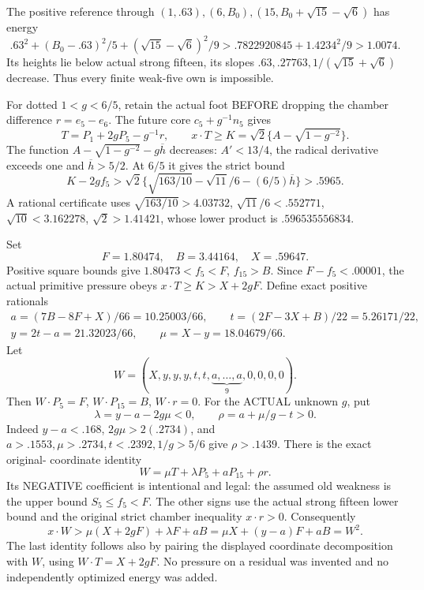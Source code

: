 \documentclass[11pt]{article}
\theoremstyle{definition}
\theoremstyle{remark}
\begin{document}
The positive reference through
\((1,.63),(6,B_0),(15,B_0+\sqrt{15}-\sqrt6)\)
has energy
\[
 .63^2+(B_0-.63)^2/5+(\sqrt{15}-\sqrt6)^2/9
                         >.7822920845+1.4234^2/9>1.0074 .
\]
Its heights lie below actual
strong fifteen, its slopes
\(.63,.27763,1/(\sqrt{15}+\sqrt6)\)
decrease.
Thus every finite weak-five own
is impossible.

For dotted \(1<g<6/5\), retain
the actual foot BEFORE dropping
the chamber difference
\(r=e_5-e_6\).
The future core
\(c_5+g^{-1}n_5\) gives
\[
 T=P_1+2gP_5-g^{-1}r,\qquad
        x\cdot T\ge K=\sqrt2\{A-\sqrt{1-g^{-2}}\}.
\]
The function
\(A-\sqrt{1-g^{-2}}-g\overline h\)
decreases: \(A'<13/4\), the
radical derivative exceeds one
and \(\overline h>5/2\).
At \(6/5\) it gives the strict
bound
\[
 K-2gf_5>
 \sqrt2\{\sqrt{163/10}-\sqrt{11}/6-(6/5)\overline h\}
                                      >.5965 .
\]
A rational certificate uses
\(\sqrt{163/10}>4.03732\),
\(\sqrt{11}/6<.552771\),
\(\sqrt{10}<3.162278\),
\(\sqrt2>1.41421\), whose lower
product is \(.596535556834\).

Set
\[
 F=1.80474,\quad B=3.44164,\quad X=.59647 .
\]
Positive square bounds give
\(1.80473<f_5<F\), \(f_{15}>B\).
Since \(F-f_5<.00001\), the
actual primitive pressure obeys
\(x\cdot T\ge K>X+2gF\).
Define exact positive rationals
\[
\begin{gathered}
 a=(7B-8F+X)/66=10.25003/66,\qquad
 t=(2F-3X+B)/22=5.26171/22,\\
 y=2t-a=21.32023/66,\qquad
 \mu=X-y=18.04679/66 .
\end{gathered}
\]
Let
\[
 W=(X,y,y,y,t,t,
            \underbrace{a,\ldots,a}_{9},0,0,0,0).
\]
Then \(W\cdot P_5=F\),
\(W\cdot P_{15}=B\), \(W\cdot r=0\).
For the ACTUAL unknown \(g\), put
\[
               \lambda=y-a-2g\mu<0,\qquad
               \rho=a+\mu/g-t>0 .
\]
Indeed \(y-a<.168\),
\(2g\mu>2(.2734)\), and
\(a>.1553,\mu>.2734,t<.2392,1/g>5/6\)
give \(\rho>.1439\).
There is the exact original-
coordinate identity
\[
                         W=\mu T+\lambda P_5+aP_{15}+\rho r .
\]
Its NEGATIVE coefficient is
intentional and legal:
the assumed old weakness is
the upper bound \(S_5\le f_5<F\).
The other signs use the actual
strong fifteen lower bound and
the original strict chamber
inequality \(x\cdot r>0\).
Consequently
\[
 x\cdot W>
 \mu(X+2gF)+\lambda F+aB
       =\mu X+(y-a)F+aB=W^2 .
\]
The last identity follows also
by pairing the displayed coordinate
decomposition with \(W\), using
\(W\cdot T=X+2gF\).
No pressure on a residual was
invented and no independently
optimized energy was added.
\end{document}

